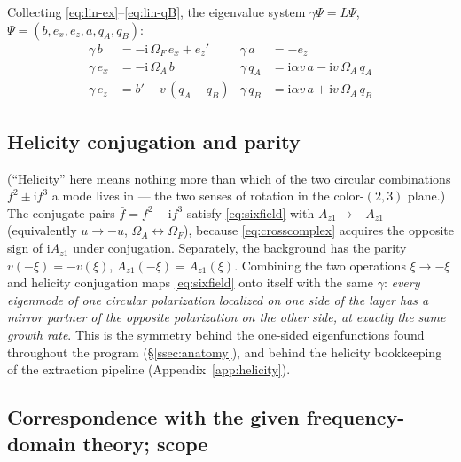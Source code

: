 \documentclass[11pt,a4paper]{article}
\numberwithin{equation}{section}
\theoremstyle{remark}
\newcommand{\OmA}{\Omega_A}
\newcommand{\OmF}{\Omega_F}
\newcommand{\Az}{A_{z1}}
\newcommand{\ii}{\mathrm{i}}
\begin{document}
\noindent Collecting \eqref{eq:lin-ex}--\eqref{eq:lin-qB}, the eigenvalue
system $\gamma\Psi=L\Psi$, $\Psi=(b,e_x,e_z,a,q_A,q_B)$:
\begin{equation}
\boxed{
\begin{aligned}
\gamma\,b &= -\ii\,\OmF\,e_x+e_z' &
\gamma\,a &= -e_z\\
\gamma\,e_x &= -\ii\,\OmA\,b &
\gamma\,q_A &= \ii\alpha v\,a-\ii v\,\OmA\,q_A\\
\gamma\,e_z &= b'+v\,(q_A-q_B) &
\gamma\,q_B &= \ii\alpha v\,a+\ii v\,\OmA\,q_B
\end{aligned}}
\label{eq:sixfield}
\end{equation}

\subsection{Helicity conjugation and parity}
\label{ssec:helicity}

(``Helicity'' here means nothing more than which of the two circular
combinations $f^2\pm\ii f^3$ a mode lives in --- the two senses of
rotation in the color-$(2,3)$ plane.)
The conjugate pairs $\bar f=f^{2}-\ii f^{3}$ satisfy \eqref{eq:sixfield}
with $\Az\to-\Az$ (equivalently $u\to-u$, $\OmA\leftrightarrow\OmF$),
because \eqref{eq:crosscomplex} acquires the opposite sign of $\ii\Az$
under conjugation. Separately, the background has the parity
$v(-\xi)=-v(\xi)$, $\Az(-\xi)=\Az(\xi)$. Combining the two operations
$\xi\to-\xi$ and helicity conjugation maps \eqref{eq:sixfield} onto itself
with the same $\gamma$: \emph{every eigenmode of one circular polarization
localized on one side of the layer has a mirror partner of the opposite
polarization on the other side, at exactly the same growth rate}. This is
the symmetry behind the one-sided eigenfunctions found throughout the
program (\S\ref{ssec:anatomy}), and behind the helicity bookkeeping of the
extraction pipeline (Appendix~\ref{app:helicity}).

\subsection{Correspondence with the given frequency-domain theory; scope}
\label{ssec:scope}
\end{document}
